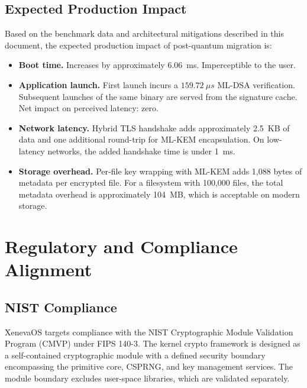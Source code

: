 \documentclass[11pt, a4paper]{article}
\begin{document}
\subsection{Expected Production Impact}\label{sec:prod-impact}

Based on the benchmark data and architectural mitigations described in this document, the expected production impact of post-quantum migration is:

\begin{itemize}
    \item \textbf{Boot time.} Increases by approximately 6.06~ms. Imperceptible to the user.
    \item \textbf{Application launch.} First launch incurs a $159.72~\mu s$ ML-DSA verification. Subsequent launches of the same binary are served from the signature cache. Net impact on perceived latency: zero.
    \item \textbf{Network latency.} Hybrid TLS handshake adds approximately 2.5~KB of data and one additional round-trip for ML-KEM encapsulation. On low-latency networks, the added handshake time is under 1~ms.
    \item \textbf{Storage overhead.} Per-file key wrapping with ML-KEM adds 1,088 bytes of metadata per encrypted file. For a filesystem with 100,000 files, the total metadata overhead is approximately 104~MB, which is acceptable on modern storage.
\end{itemize}



\section{Regulatory and Compliance Alignment}\label{sec:compliance}

\subsection{NIST Compliance}\label{sec:nist-compliance}

XenevaOS targets compliance with the NIST Cryptographic Module Validation Program (CMVP) under FIPS 140-3. The kernel crypto framework is designed as a self-contained cryptographic module with a defined security boundary encompassing the primitive core, CSPRNG, and key management services. The module boundary excludes user-space libraries, which are validated separately.
\end{document}
